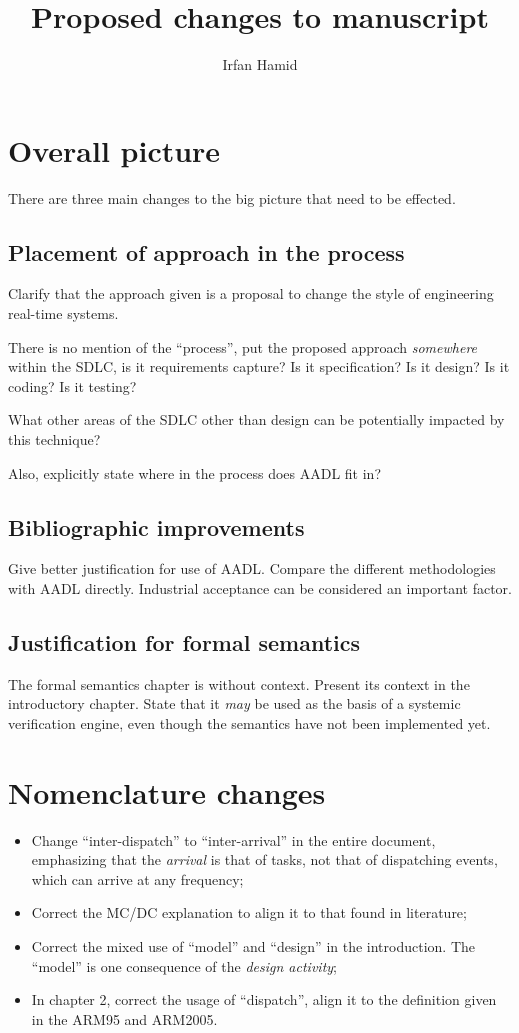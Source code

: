 \documentclass{article}
\title{Proposed changes to manuscript}
\author{Irfan Hamid}
\begin{document}
\maketitle

\section{Overall picture}
There are three main changes to the big picture that need to be
effected.

\subsection{Placement of approach in the process}
Clarify that the approach given is a proposal to change the style of
engineering real-time systems.

There is no mention of the ``process'', put the proposed approach
\emph{somewhere} within the SDLC, is it requirements capture? Is it
specification? Is it design? Is it coding? Is it testing?

What other areas of the SDLC other than design can be potentially
impacted by this technique?

Also, explicitly state where in the process does AADL fit in?

\subsection{Bibliographic improvements}
Give better justification for use of AADL. Compare the different
methodologies with AADL directly. Industrial acceptance can be
considered an important factor.

\subsection{Justification for formal semantics}
The formal semantics chapter is without context. Present its context
in the introductory chapter. State that it \emph{may} be used as the
basis of a systemic verification engine, even though the semantics
have not been implemented yet.

\section{Nomenclature changes}

\begin{itemize}
\item{Change ``inter-dispatch'' to ``inter-arrival'' in the entire
  document, emphasizing that the \emph{arrival} is that of tasks, not
  that of dispatching events, which can arrive at any frequency;}
\item{Correct the MC/DC explanation to align it to that found in
  literature;}
\item{Correct the mixed use of ``model'' and ``design'' in the
  introduction. The ``model'' is one consequence of the \emph{design
    activity};}
\item{In chapter 2, correct the usage of ``dispatch'', align it to the
  definition given in the ARM95 and ARM2005.}
\end{itemize}
\end{document}
